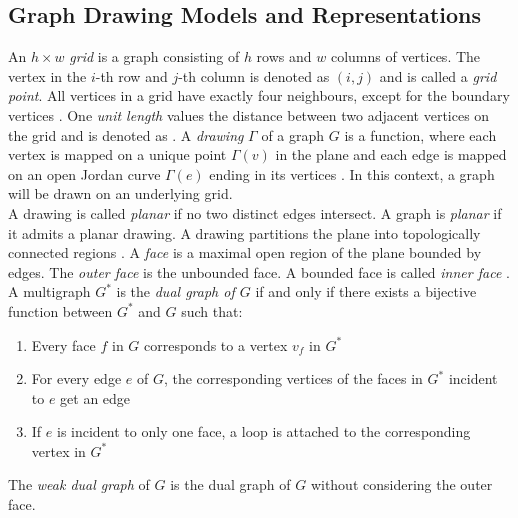 
\subsection{Graph Drawing Models and Representations}
An $h \times w$ \emph{grid} is a graph consisting of $h$ rows and $w$ columns of vertices. The vertex in the $i$-th row and $j$-th column is denoted as $(i,j)$ and is called a \emph{grid point}. All vertices in a grid have exactly four neighbours, except for the boundary vertices \cite[P. 760]{DBLP:cormen_intro_to_algorithms}. One \emph{unit length} values the distance between two adjacent vertices on the grid and is denoted as \UL.
A \emph{drawing} $\Gamma$ of a graph $G$ is a function, where each vertex is mapped on a unique point $\Gamma(v)$ in the plane and each edge is mapped on an open Jordan curve $\Gamma(e)$ ending in its vertices \cite[P. 225]{Duncan_planar_polyline_drawings}. In this context, a graph will be drawn on an underlying grid.\\
A drawing is called \emph{planar} if no two distinct edges intersect. 
A graph is \emph{planar} if it admits a planar drawing\cite[Page 100]{DBLP:cormen_intro_to_algorithms}.
A drawing partitions the plane into topologically connected regions \cite[P. 7]{battista_1999}. A \emph{face} is a maximal open region of the plane bounded by edges. The \emph{outer face} is the unbounded face. A bounded face is called \emph{inner face} \cite[S. 86]{Diestel_GraphTheory}.\\
A multigraph $G^*$ is the \emph{dual graph of $G$} if and only if there exists a bijective function between $G^*$ and $G$ such that:
\begin{enumerate}
	\item Every face $f$ in $G$ corresponds to a vertex $v_f$ in $G^*$
	\item For every edge $e$ of $G$, the corresponding vertices of the faces in $G^*$ incident to $e$ get an edge 
	\item If $e$ is incident to only one face, a loop is attached to the corresponding vertex in $G^*$
\end{enumerate}\cite[P. 103]{Diestel_GraphTheory}
The \emph{weak dual graph} of $G$ is the dual graph of $G$ without considering the outer face.\\

